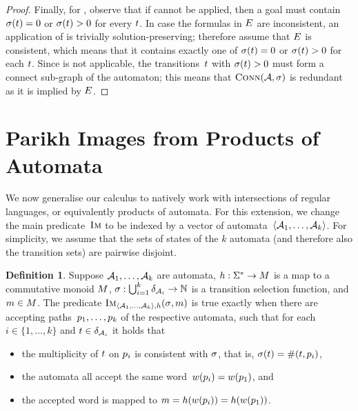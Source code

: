 \documentclass[acmsmall,review,anonymous,screen]{acmart}\settopmatter{printfolios=true,printccs=true,printacmref=true}
\theoremstyle{definition}
\newtheorem{definition}{Definition}[section]
\begin{document}
\begin{proof}
  Finally, for \Subsume{}, observe that if \Split{} cannot be applied,
  then a goal must contain~$\operatorname{\sigma}(t) = 0$ or
  $\operatorname{\sigma}(t) > 0$ for every $t$. In case the
  formulas in $E$ are inconsistent, an application of
  \Subsume{} is trivially solution-preserving; therefore assume that
  $E$ is consistent, which means that it contains
  exactly one of $\operatorname{\sigma}(t) = 0$ or
  $\operatorname{\sigma}(t) > 0$ for each $t$. Since
  \Propagate{} is not applicable, the transitions~$t$ with
  $\operatorname{\sigma}(t) > 0$ must form a connect sub-graph of the
  automaton; this means that $\operatorname{\textsc{Conn}}(\mathcal{A}, \operatorname{\sigma})$ is
  redundant as it is implied by $E$.
\end{proof}


\section{Parikh Images from Products of Automata}\label{sec:multiple}

We now generalise our calculus to natively work with intersections of
regular languages, or equivalently products of automata. For this
extension, we change the main predicate~$\operatorname{\textsc{Im}}$ to be indexed by a
vector of automata~$\left\langle\mathcal{A}_1, \ldots, \mathcal{A}_k\right\rangle$.  For
simplicity, we assume that the sets of states of the $k$ automata (and
therefore also the transition sets) are pairwise disjoint. 
\begin{definition}\label{def:multiple}
  Suppose $\mathcal{A}_1, \ldots, \mathcal{A}_k$ are automata,
  $h : \Sigma^* \to M$ is a map to a commutative monoid
  $M$,
  $\operatorname{\sigma}: \bigcup_{i=1}^k \delta_{\mathcal{A}_i} \to \mathbb{N}$
  is a transition selection function, and
  $m \in M$. The predicate
  $\operatorname{\textsc{Im}}_{\left\langle\mathcal{A}_1, \ldots,
      \mathcal{A}_k\right\rangle, h}(\operatorname{\sigma}, m)$ is true exactly
  when there are accepting paths~$p_1, \ldots, p_k$ of the
  respective automata, such that for each $i \in \{1, \ldots, k\}$ and
  $t \in \delta_{\mathcal{A}_i}$ it holds that
  \begin{itemize}
  \item the multiplicity of $t$ on $p_i$ is consistent with
    $\operatorname{\sigma}$, that is,
    $\operatorname{\sigma}(t) = \operatorname{\#}(t, p_i)$,
  \item the automata all accept the same
    word~$w(p_i) = w(p_1)$, and
  \item the accepted word is mapped to
    $m = h(w(p_i)) =
    h(w(p_1))$.
  \end{itemize}
\end{definition}
\end{document}
